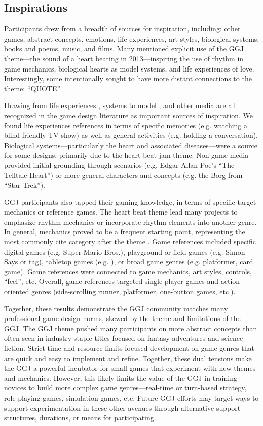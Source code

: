 \documentclass{sig-alternate}
\begin{document}
\subsection{Inspirations}
Participants drew from a breadth of sources for inspiration, including: other games, abstract concepts, emotions, life experiences, art styles, biological systems, books and poems, music, and films. Many mentioned explicit use of the GGJ theme---the sound of a heart beating in 2013---inspiring the use of rhythm in game mechanics, biological hearts as model systems, and life experiences of love. Interestingly, some intentionally sought to have more distant connections to the theme:
``QUOTE''  

Drawing from life experiences \cite{anthropy2012:zinesters}, systems to model \cite{crawford1984:gamedesign}, and other media \cite{bogost2011:howto} are all recognized in the game design literature as important sources of inspiration.
We found life experiences references in terms of specific memories (e.g. watching a blind-friendly TV show) as well as general activities (e.g. holding a conversation).
Biological systems---particularly the heart and associated diseases---were a source for some designs, primarily due to the heart beat jam theme.
Non-game media provided initial grounding through scenarios (e.g. Edgar Allan Poe's ``The Telltale Heart'') or more general characters and concepts (e.g. the Borg from ``Star Trek'').

GGJ participants also tapped their gaming knowledge, in terms of specific target mechanics or reference games.
The heart beat theme lead many projects to emphasize rhythm mechanics or incorporate rhythm elements into another genre. In general, mechanics proved to be a frequent starting point, representing the most commonly cite category  after the theme .
Game references included specific digital games (e.g. Super Mario Bros.), playground or field games (e.g. Simon Says or tag), tabletop games (e.g. ), or broad game genres (e.g. platformer, card game). Game references were connected to game mechanics, art styles, controls, ``feel'', etc. Overall, game references targeted single-player games and action-oriented genres (side-scrolling runner, platformer, one-button games, etc.).

Together, these results demonstrate the GGJ community matches many professional game design norms, skewed by the theme and limitations of the GGJ. The GGJ theme pushed many participants on more abstract concepts than often seen in industry staple titles focused on fantasy adventures and science fiction. Strict time and resource limits focused development on game genres that are quick and easy to implement and refine. Together, these dual tensions make the GGJ a powerful incubator for small games that experiment with new themes and mechanics. However, this likely limits the value of the GGJ in training novices to build more complex game genres---real-time or turn-based strategy, role-playing games, simulation games, etc. Future GGJ efforts may target ways to support experimentation in these other avenues through alternative support structures, durations, or means for participating.
\end{document}
